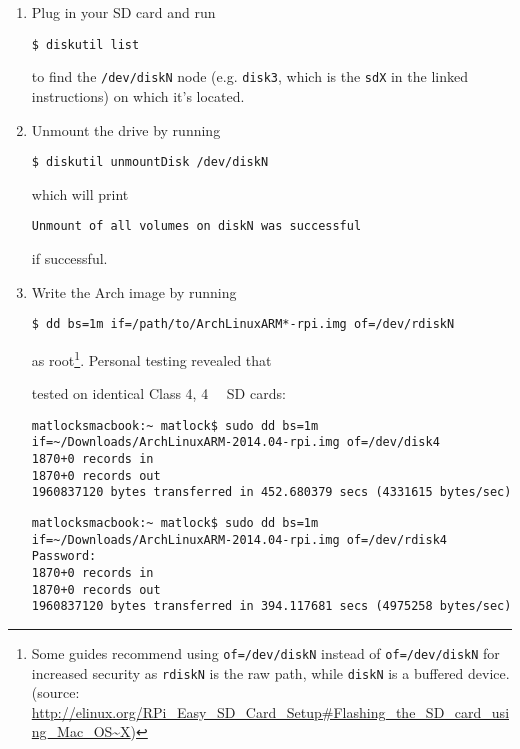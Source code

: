 \documentclass[12pt,letterpaper]{article}
\begin{document}
\begin{enumerate}
\item Plug in your SD card and run

\begin{lstlisting}
$ diskutil list
\end{lstlisting}
to find the \lstinline{/dev/diskN} node (e.g. \lstinline{disk3}, which is the \lstinline{sdX} in the linked instructions) on which it's located.

\item Unmount the drive by running

\begin{lstlisting}
$ diskutil unmountDisk /dev/diskN
\end{lstlisting}

which will print

\begin{lstlisting}
Unmount of all volumes on diskN was successful
\end{lstlisting}

if successful.

\item Write the Arch image by running

\begin{lstlisting}
$ dd bs=1m if=/path/to/ArchLinuxARM*-rpi.img of=/dev/rdiskN
\end{lstlisting}
as root\footnote{Some guides recommend using \lstinline{of=/dev/diskN} instead of \lstinline{of=/dev/diskN} for increased security as \lstinline{rdiskN} is the raw path, while \lstinline{diskN} is a buffered device. (source: %
\url{http://elinux.org/RPi_Easy_SD_Card_Setup\#Flashing_the_SD_card_using_Mac_OS~X}) }. %
Personal testing revealed that

tested on identical Class 4, \SI{4}{\giga\byte} SD cards:
\begin{lstlisting}
matlocksmacbook:~ matlock$ sudo dd bs=1m if=~/Downloads/ArchLinuxARM-2014.04-rpi.img of=/dev/disk4
1870+0 records in
1870+0 records out
1960837120 bytes transferred in 452.680379 secs (4331615 bytes/sec)
\end{lstlisting}

\begin{lstlisting}
matlocksmacbook:~ matlock$ sudo dd bs=1m if=~/Downloads/ArchLinuxARM-2014.04-rpi.img of=/dev/rdisk4
Password:
1870+0 records in
1870+0 records out
1960837120 bytes transferred in 394.117681 secs (4975258 bytes/sec)
\end{lstlisting}

\end{enumerate}
\end{document}
